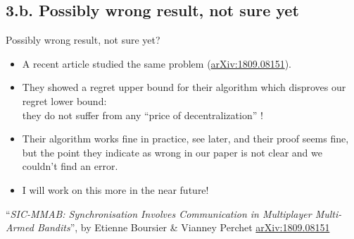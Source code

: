 \documentclass[12pt,english,ignorenonframetext,]{beamer}
\providecommand{\tightlist}{%
  \setlength{\itemsep}{0pt}\setlength{\parskip}{0pt}}
\begin{document}
\subsection{\hfill{}3.b. Possibly wrong result, not sure yet\hfill{}}

\begin{frame}{Possibly wrong result, not sure yet?}

\begin{itemize}\tightlist
\item
A recent article studied the same problem (\textcolor{blue}{\href{https://arxiv.org/abs/1809.08151}{arXiv:1809.08151}}).

\pause

\item
They showed a regret upper bound for their \SICMMAB{} algorithm which disproves our regret lower bound:\\
they do not suffer from any ``price of decentralization'' {\Sadey} !


\pause
\vspace*{15pt}

\item
Their algorithm works fine in practice, see later,
and their proof seems fine, but the point they indicate as wrong in our paper is not clear and we couldn't find an error.

\item
I will work on this more in the near future!
\end{itemize}

\vfill{}
\begin{footnotesize}
  ``\emph{SIC-MMAB: Synchronisation Involves Communication in Multiplayer Multi-Armed Bandits}'',
  by Etienne Boursier \& Vianney Perchet
  \textcolor{blue}{\href{https://arxiv.org/abs/1809.08151}{arXiv:1809.08151}}
\end{footnotesize}

\end{frame}
\end{document}
